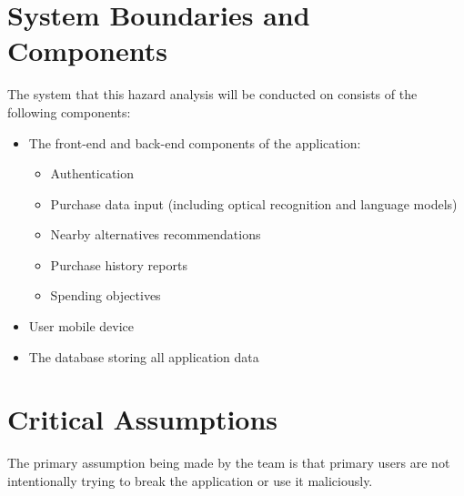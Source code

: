 \documentclass{article}
\begin{document}
\section{System Boundaries and Components}
The system that this hazard analysis will be conducted on consists of the following components:
\begin{itemize}
    \item The front-end and back-end components of the application:
        \begin{itemize}
            \item Authentication
            \item Purchase data input (including optical recognition and language models)
            \item Nearby alternatives recommendations
            \item Purchase history reports
            \item Spending objectives
        \end{itemize}
    \item User mobile device
    \item The database storing all application data
\end{itemize}

\section{Critical Assumptions}

The primary assumption being made by the team is that primary users are not intentionally
trying to break the application or use it maliciously.
\end{document}
